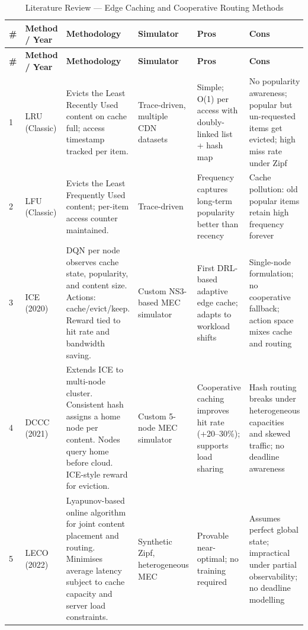\documentclass[12pt,a4paper]{report}
\begin{document}
\begin{longtable}{|C{0.3cm}|L{1.9cm}|L{3.0cm}|L{2.1cm}|L{2.3cm}|L{2.3cm}|}
\caption{Literature Review --- Edge Caching and Cooperative Routing Methods}
\label{tab:litreview}\\
\hline
\textbf{\#} & \textbf{Method / Year} & \textbf{Methodology} & \textbf{Simulator} & \textbf{Pros} & \textbf{Cons}\\
\hline
\endfirsthead
\hline
\textbf{\#} & \textbf{Method / Year} & \textbf{Methodology} & \textbf{Simulator} & \textbf{Pros} & \textbf{Cons}\\
\hline
\endhead
\hline
\endfoot

1 & LRU (Classic) & Evicts the Least Recently Used content on cache full; access timestamp tracked per item. &
Trace-driven, multiple CDN datasets &
Simple; O(1) per access with doubly-linked list + hash map &
No popularity awareness; popular but un-requested items get evicted; high miss rate under Zipf\\
\hline

2 & LFU (Classic) & Evicts the Least Frequently Used content; per-item access counter maintained. &
Trace-driven &
Frequency captures long-term popularity better than recency &
Cache pollution: old popular items retain high frequency forever\\
\hline

3 & ICE~\cite{ref1} (2020) & DQN per node observes cache state, popularity, and content size. Actions: cache/evict/keep. Reward tied to hit rate and bandwidth saving. &
Custom NS3-based MEC simulator &
First DRL-based adaptive edge cache; adapts to workload shifts &
Single-node formulation; no cooperative fallback; action space mixes cache and routing\\
\hline

4 & DCCC~\cite{ref2} (2021) & Extends ICE to multi-node cluster. Consistent hash assigns a home node per content. Nodes query home before cloud. ICE-style reward for eviction. &
Custom 5-node MEC simulator &
Cooperative caching improves hit rate (+20--30\%); supports load sharing &
Hash routing breaks under heterogeneous capacities and skewed traffic; no deadline awareness\\
\hline

5 & LECO~\cite{ref3} (2022) & Lyapunov-based online algorithm for joint content placement and routing. Minimises average latency subject to cache capacity and server load constraints. &
Synthetic Zipf, heterogeneous MEC &
Provable near-optimal; no training required &
Assumes perfect global state; impractical under partial observability; no deadline modelling\\
\hline


\end{longtable}
\end{document}

